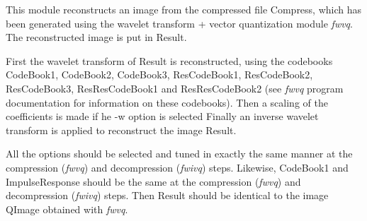 This module reconstructs an image from the compressed file Compress, 
which has been generated using the wavelet transform + vector quantization 
module {\em fwvq}. The reconstructed image is put in Result. 

First the wavelet transform of Result is reconstructed, 
using the codebooks CodeBook1, CodeBook2, CodeBook3, ResCodeBook1, 
ResCodeBook2, ResCodeBook3, ResResCodeBook1 and ResResCodeBook2 
(see {\em fwvq} program documentation for information on these codebooks). 
Then a scaling of the coefficients is made if he -w option is selected
Finally an inverse wavelet transform is applied to reconstruct the image
Result. 

All the options should be selected and tuned in exactly the same 
manner at the compression ({\em fwvq}) and decompression ({\em fwivq}) steps. 
Likewise, CodeBook1 and ImpulseResponse should be the same 
at the compression ({\em fwvq}) and decompression ({\em fwivq}) steps. 
Then Result should be identical to the image QImage obtained with {\em fwvq}. 
